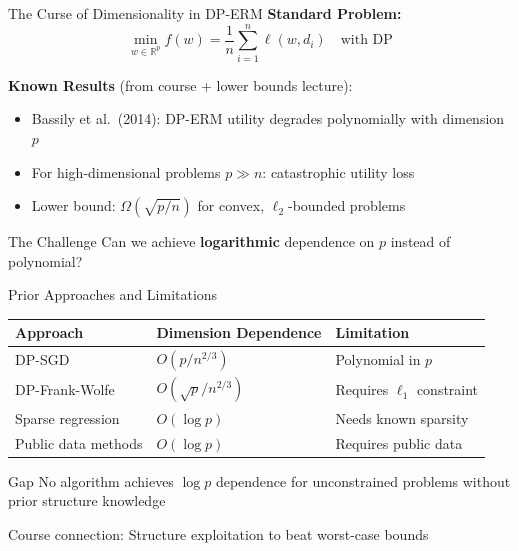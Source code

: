 \documentclass{beamer}
\begin{document}
\begin{frame}{The Curse of Dimensionality in DP-ERM}
\textbf{Standard Problem:}
\[
\min_{w \in \mathbb{R}^p} f(w) = \frac{1}{n} \sum_{i=1}^{n} \ell(w, d_i)
\quad \text{with DP}
\]

\vspace{1em}

\textbf{Known Results} (from course + lower bounds lecture):
\begin{itemize}
\item Bassily et al.\ (2014): DP-ERM utility degrades polynomially with dimension $p$
\item For high-dimensional problems $p \gg n$: catastrophic utility loss
\item Lower bound: $\Omega(\sqrt{p/n})$ for convex, $\ell_2$-bounded problems
\end{itemize}

\vspace{1em}

\begin{block}{The Challenge}
Can we achieve \textbf{logarithmic} dependence on $p$ instead of polynomial?
\end{block}
\end{frame}

\begin{frame}{Prior Approaches and Limitations}
\begin{table}
\begin{tabular}{l|l|l}
\textbf{Approach} & \textbf{Dimension Dependence} & \textbf{Limitation} \\ \hline
DP-SGD & $O(p / n^{2/3})$ & Polynomial in $p$ \\
DP-Frank-Wolfe & $O(\sqrt{p} / n^{2/3})$ & Requires $\ell_1$ constraint \\
Sparse regression & $O(\log p)$ & Needs known sparsity \\
Public data methods & $O(\log p)$ & Requires public data \\
\end{tabular}
\end{table}

\vspace{1em}

\begin{alertblock}{Gap}
No algorithm achieves $\log p$ dependence for unconstrained problems without prior structure knowledge
\end{alertblock}

\vspace{0.5em}

\alert{Course connection:} Structure exploitation to beat worst-case bounds
\end{frame}
\end{document}
